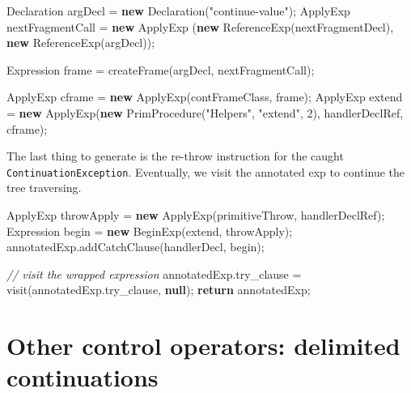 \documentclass[12pt,a4paper,oneside,openright]{book}
\newenvironment{Shaded}{\begin{snugshade}}{\end{snugshade}}
\newcommand{\KeywordTok}[1]{\textcolor[rgb]{0.13,0.29,0.53}{\textbf{{#1}}}}
\newcommand{\DecValTok}[1]{\textcolor[rgb]{0.00,0.00,0.81}{{#1}}}
\newcommand{\StringTok}[1]{\textcolor[rgb]{0.31,0.60,0.02}{{#1}}}
\newcommand{\CommentTok}[1]{\textcolor[rgb]{0.56,0.35,0.01}{\textit{{#1}}}}
\newcommand{\FunctionTok}[1]{\textcolor[rgb]{0.00,0.00,0.00}{{#1}}}
\newcommand{\NormalTok}[1]{{#1}}
\begin{document}
\begin{Shaded}
\begin{Highlighting}[]
\NormalTok{Declaration argDecl = }\KeywordTok{new} \FunctionTok{Declaration}\NormalTok{(}\StringTok{"continue-value"}\NormalTok{);}
\NormalTok{ApplyExp nextFragmentCall = }\KeywordTok{new} \NormalTok{ApplyExp}
                                 \NormalTok{(}\KeywordTok{new} \FunctionTok{ReferenceExp}\NormalTok{(nextFragmentDecl),}
                                  \KeywordTok{new} \FunctionTok{ReferenceExp}\NormalTok{(argDecl));}

\NormalTok{Expression frame = }\FunctionTok{createFrame}\NormalTok{(argDecl, nextFragmentCall);}

\NormalTok{ApplyExp cframe = }\KeywordTok{new} \FunctionTok{ApplyExp}\NormalTok{(contFrameClass,}
                               \NormalTok{frame);}
\NormalTok{ApplyExp extend = }\KeywordTok{new} \FunctionTok{ApplyExp}\NormalTok{(}\KeywordTok{new} \FunctionTok{PrimProcedure}\NormalTok{(}\StringTok{"Helpers"}\NormalTok{,}
                                                 \StringTok{"extend"}\NormalTok{, }\DecValTok{2}\NormalTok{),}
                               \NormalTok{handlerDeclRef,}
                               \NormalTok{cframe);}
\end{Highlighting}
\end{Shaded}

The last thing to generate is the re-throw instruction for the caught
\texttt{ContinuationException}. Eventually, we visit the annotated exp
to continue the tree traversing.

\begin{Shaded}
\begin{Highlighting}[]
\NormalTok{ApplyExp throwApply = }\KeywordTok{new} \FunctionTok{ApplyExp}\NormalTok{(primitiveThrow,}
                                   \NormalTok{handlerDeclRef);}
\NormalTok{Expression begin = }\KeywordTok{new} \FunctionTok{BeginExp}\NormalTok{(extend, throwApply);}
\NormalTok{annotatedExp.}\FunctionTok{addCatchClause}\NormalTok{(handlerDecl, begin);}

\CommentTok{// visit the wrapped expression}
\NormalTok{annotatedExp.}\FunctionTok{try_clause} \NormalTok{= }\FunctionTok{visit}\NormalTok{(annotatedExp.}\FunctionTok{try_clause}\NormalTok{, }\KeywordTok{null}\NormalTok{);}
\KeywordTok{return} \NormalTok{annotatedExp;}
\end{Highlighting}
\end{Shaded}

\section{Other control operators: delimited
continuations}\label{other-control-operators-delimited-continuations}
\end{document}
